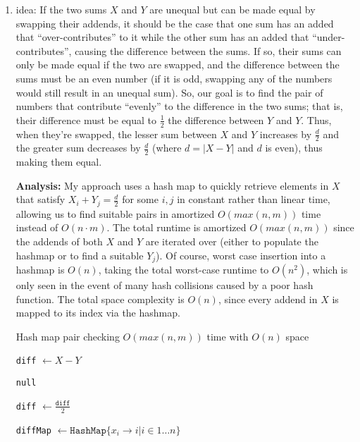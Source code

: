 \documentclass[12pt]{article}
\begin{document}
\begin{enumerate}
\begin{enumerate}
    \end{enumerate}
    
    \item idea: If the two sums $X$ and $Y$ are unequal but can be made equal by swapping their addends, it should be the 
    case that one sum has an added that ``over-contributes'' to it while the other sum has an added that ``under-contributes'', causing the 
    difference between the sums. If so, their sums can only be made equal if the two are swapped, and the difference between the sums must 
    be an even number (if it is odd, swapping any of the numbers would still result in an unequal sum). So, our goal is to 
    find the pair of numbers that contribute ``evenly'' to the difference in the two sums; that is, their difference must be 
    equal to $\frac{1}{2}$ the difference between $Y$ and $Y$. Thus, when they're swapped, the lesser sum between $X$ and $Y$ 
    increases by $\frac{d}{2}$ and the greater sum decreases by $\frac{d}{2}$ (where $d = |X - Y|$ and $d$ is even), thus making them equal.

    \textbf{Analysis:} My approach uses a hash map to quickly retrieve elements in $X$ that satisfy $X_i + Y_j = \frac{d}{2}$ for some $i, j$ in 
    constant rather than linear time, allowing us to find suitable pairs in amortized $O(max(n, m))$ time instead of $O(n \cdot m)$.
    The total runtime is amortized $O(max(n, m))$ since the addends of both $X$ and $Y$ are iterated over (either to populate the hashmap or to find a suitable $Y_j$). Of course, worst 
    case insertion into a hashmap is $O(n)$, taking the total worst-case runtime to $O(n^2)$, which is only seen in the event of 
    many hash collisions caused by a poor hash function. The total space complexity is $O(n)$, since every addend in $X$ is mapped to its index via the hashmap.

    \begin{algorithm}
        \caption{Hash map pair checking $O(max(n, m))$ time with $O(n)$ space}
        \begin{algorithmic}
            \State \texttt{diff} $\gets X - Y$

                \State \Return \texttt{null}
            \EndIf

            \State \texttt{diff} $\gets \frac{\texttt{diff}}{2}$

            \State \texttt{diffMap} $ \gets \texttt{HashMap}\{x_i \rightarrow i | i \in 1 \dots n\}$\\


\end{algorithmic}
\end{algorithm}
\end{enumerate}
\end{document}
